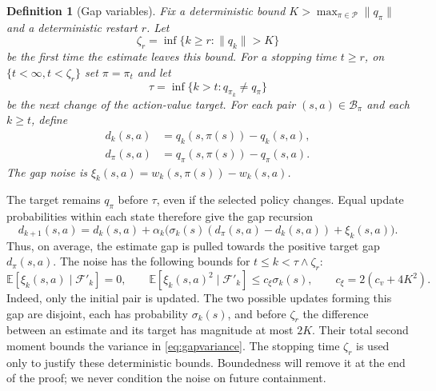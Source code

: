 \documentclass[twoside,11pt]{article}
\newtheorem{definition}[definition]{Definition}
\DeclareRobustCommand{\reviewbarstart}{%
  \ifhmode %
    \vadjust{\vbox to 0pt{%
      \vskip-\ht\strutbox %
      \vskip-\dp\strutbox %
      \cbstart[\changebarwidth] %
      \vss %
    }}%
  \else %
    \cbstart[\changebarwidth]%
  \fi %
} %
\providecommand{\DIFadd}[1]{#1} %
\providecommand{\DIFaddbegin}{\reviewbarstart} %
\providecommand{\DIFaddend}{\protect\cbend} %
\def\DIFadd#1{#1}%
\def\DIFaddbegin{}%
\def\DIFaddend{}%
\begin{document}
 \begin{definition}[Gap variables]
\label{def: gap variables}
 \DIFaddbegin \DIFadd{Fix a deterministic bound $K>\max_{\pi\in\mathcal P}\|q_\pi\|$ and a deterministic restart $r$. Let
}\[
\DIFadd{\zeta_r=\inf\{k\ge r:\|q_k\|>K\}
}\]
\DIFadd{be the first time the estimate leaves this bound.
For a stopping time $t\ge r$, on $\{t<\infty,t<\zeta_r\}$ set $\pi=\pi_t$ and let
}\[
\DIFadd{\tau=\inf\{k>t:q_{\pi_k}\ne q_\pi\}
}\]
\DIFadd{be the next change of the action-value target.
}\DIFaddend For each  \DIFaddbegin \DIFadd{pair $(s,a)\in\mathcal B_\pi$ and each $k\ge t$, }\DIFaddend define
 \DIFaddbegin \begin{align}
\DIFadd{\label{eq:gaps}
d_k(s,a)}&\DIFadd{=q_k(s,\pi(s))-q_k(s,a),}\\
\DIFadd{d_\pi(s,a)}&\DIFadd{=q_\pi(s,\pi(s))-q_\pi(s,a).
}\end{align}\DIFaddend 
 \DIFaddbegin \DIFadd{The gap noise is $\xi_k(s,a)=w_k(s,\pi(s))-w_k(s,a)$.
}\DIFaddend \end{definition}

 \DIFaddbegin \DIFadd{The target remains $q_\pi$ before $\tau$, even if the selected policy changes. Equal update probabilities within each state therefore give the gap recursion
}\begin{equation}
\DIFadd{\label{eq:gapdrift}
d_{k+1}(s,a)=d_k(s,a)+\alpha_k\big(\sigma_k(s)(d_\pi(s,a)-d_k(s,a))+\xi_k(s,a)\big).
}\end{equation}\DIFaddend 
 \DIFaddbegin \DIFadd{Thus, on average, the estimate gap is pulled towards the positive target gap $d_\pi(s,a)$. The noise has the following bounds for $t\le k<\tau\wedge\zeta_r$:
}\begin{equation}
\DIFadd{\label{eq:gapvariance}
\mathbb E}[\DIFadd{\xi_k(s,a)\mid\mathcal F'_k}]\DIFadd{=0,
\qquad
\mathbb E}[\DIFadd{\xi_k(s,a)^2\mid\mathcal F'_k}]\DIFadd{\le c_\xi\sigma_k(s),
\qquad c_\xi=2(c_v+4K^2).
}\end{equation}\DIFaddend 
 \DIFaddbegin \DIFadd{Indeed, only the initial pair is updated. }\DIFaddend The  \DIFaddbegin \DIFadd{two possible updates forming this gap are disjoint, each has probability $\sigma_k(s)$, and before $\zeta_r$ the difference between an estimate and its target has magnitude at most $2K$. Their total second moment bounds the variance in \eqref{eq:gapvariance}.
The stopping time $\zeta_r$ is used only to justify these deterministic bounds. Boundedness will remove it at the end of the proof; we never condition the noise on future containment.
}\DIFaddend 
\end{document}
